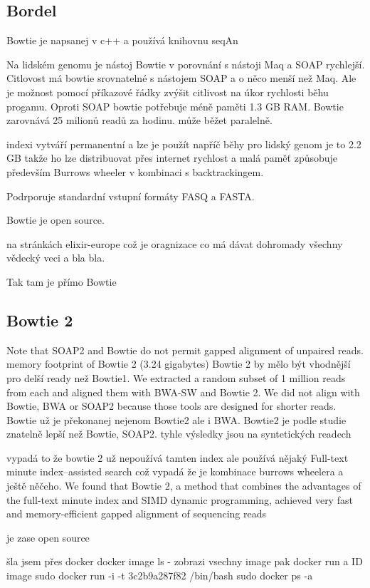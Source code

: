 \documentclass[czech,DP]{thesiskiv}
\begin{document}
\subsection{Bordel}
Bowtie je napsanej v c++ a používá knihovnu seqAn

Na lidském genomu je nástoj Bowtie v porovnání s nástoji Maq a SOAP rychlejší. 
Citlovost má bowtie srovnatelné s nástojem SOAP a o něco menší než Maq. Ale je možnost pomocí příkazové řádky zvýšit citlivost na úkor rychlosti běhu progamu.
Oproti SOAP bowtie potřebuje méně paměti 1.3 GB RAM. 
Bowtie zarovnává  25 milionů readů za hodinu. může běžet paralelně.

indexi vytváří permanentní a lze je použít napříč běhy 
pro lidský genom je to 2.2 GB takže ho lze distribuovat přes internet
rychlost a malá paměť způsobuje především Burrows wheeler v kombinaci s backtrackingem.

Podrporuje standardní vstupní formáty FASQ a FASTA.

Bowtie je open source.

 
na stránkách elixir-europe což je oragnizace co má dávat dohromady všechny vědecký veci a bla bla.



Tak tam je přímo Bowtie \cite{bowtie}

\subsection{Bowtie 2}
Note that SOAP2 and Bowtie do not permit gapped alignment of unpaired reads.
 memory footprint of Bowtie 2 (3.24 gigabytes)
 Bowtie 2 by mělo být vhodnější pro delší ready než Bowtie1.
 We extracted a random subset of 1 million reads from each and aligned them with BWA-SW and Bowtie 2. We did not align with Bowtie, BWA or SOAP2 because those tools are designed for shorter reads.
Bowtie už je překonanej nejenom Bowtie2 ale i BWA.
Bowtie2 je podle studie znatelně lepší než Bowtie, SOAP2.
tyhle výsledky jsou na syntetických readech

vypadá to že bowtie 2 už nepoužívá tamten index ale používá nějaký Full-text minute index–assisted search což vypadá že je kombinace burrows wheelera a ještě něčeho.
We found that Bowtie 2, a method that combines the advantages of the full-text minute index and SIMD dynamic programming, achieved very fast and memory-efficient gapped alignment of sequencing reads

je zase open source
\cite{bowtie2}


šla jsem přes docker docker image ls - zobrazi vsechny image pak docker run a ID image
sudo docker run -i -t 3c2b9a287f82 /bin/bash
sudo docker ps -a
\end{document}
